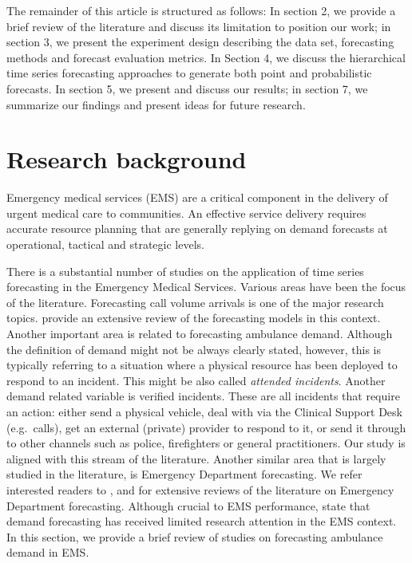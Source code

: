 \documentclass[
  authoryear,
  preprint,
  3p]{elsarticle}
\begin{document}
The remainder of this article is structured as follows: In section 2, we
provide a brief review of the literature and discuss its limitation to
position our work; in section 3, we present the experiment design
describing the data set, forecasting methods and forecast evaluation
metrics. In Section 4, we discuss the hierarchical time series
forecasting approaches to generate both point and probabilistic
forecasts. In section 5, we present and discuss our results; in section
7, we summarize our findings and present ideas for future research.

\hypertarget{lit}{%
\section{Research background}\label{lit}}

Emergency medical services (EMS) are a critical component in the
delivery of urgent medical care to communities. An effective service
delivery requires accurate resource planning that are generally replying
on demand forecasts at operational, tactical and strategic levels.

There is a substantial number of studies on the application of time
series forecasting in the Emergency Medical Services. Various areas have
been the focus of the literature. Forecasting call volume arrivals is
one of the major research topics. \citet{ibrahim2016modeling} provide an
extensive review of the forecasting models in this context. Another
important area is related to forecasting ambulance demand. Although the
definition of demand might not be always clearly stated, however, this
is typically referring to a situation where a physical resource has been
deployed to respond to an incident. This might be also called
\emph{attended incidents}. Another demand related variable is verified
incidents. These are all incidents that require an action: either send a
physical vehicle, deal with via the Clinical Support Desk (e.g.~calls),
get an external (private) provider to respond to it, or send it through
to other channels such as police, firefighters or general practitioners.
Our study is aligned with this stream of the literature. Another similar
area that is largely studied in the literature, is Emergency Department
forecasting. We refer interested readers to \citet{mingliterature2022},
\citet{gul2020exhaustive} and \citet{wargon2009systematic} for extensive
reviews of the literature on Emergency Department forecasting. Although
crucial to EMS performance, \citet{aringhieri2017emergency} state that
demand forecasting has received limited research attention in the EMS
context. In this section, we provide a brief review of studies on
forecasting ambulance demand in EMS.
\end{document}
